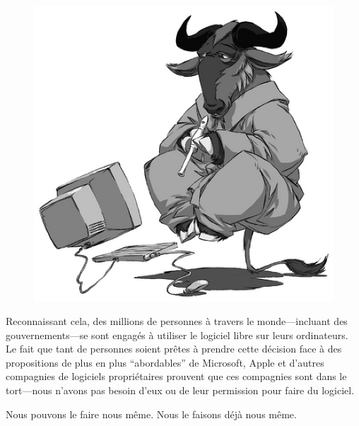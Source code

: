 \documentclass[12pt]{article}
\begin{document}
\begin{figure}
  \vspace{-0.25in}
  \begin{center}
    \includegraphics[scale=0.45]{gnu-think-smaller.eps}
  \end{center}
\end{figure}

Reconnaissant cela, des millions de personnes à travers le monde---incluant des
gouvernements---se sont engagés à utiliser le logiciel libre sur leurs
ordinateurs. Le fait que tant de personnes soient prêtes à prendre cette
décision face à des propositions de plus en plus ``abordables'' de Microsoft,
Apple et d'autres compagnies de logiciels propriétaires prouvent que ces
compagnies sont dans le tort---nous n'avons pas besoin d'eux ou de leur
permission pour faire du logiciel.


Nous pouvons le faire nous même. Nous le faisons déjà nous même.
\end{document}
